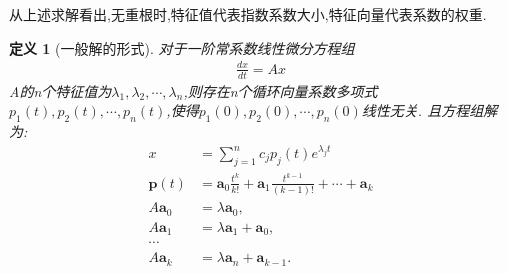 \documentclass[12pt, a4paper, oneside]{ctexbook}
\newtheorem{definition}[theorem]{定义}
\begin{document}
    从上述求解看出,无重根时,特征值代表指数系数大小,特征向量代表系数的权重.\\
    \begin{definition}[一般解的形式]
        对于一阶常系数线性微分方程组
        \begin{align}
            \frac{d\mathbf{\mathit{x}}}{dt}=A\mathbf{\mathit{x}}
        \end{align}
        A的n个特征值为$\lambda_1,\lambda_2,\cdots,\lambda_{n}$,则存在n个循环向量系数多项式
        $ p_1(t),p_2(t),\cdots,p_n(t)$,使得$ p_1(0),p_2(0),\cdots,p_n(0)$线性无关.
        且方程组解为:
        \begin{align}
            x&=\sum_{j=1}^nc_jp_j(t)e^{\lambda_jt}\\
            \boldsymbol{p}\left(t\right)&=\boldsymbol{a}_{0}\frac{t^{k}}{k!}+\boldsymbol{a}_{1}\frac{t^{k-1}}{\left(k-1\right)!}+\cdots+\boldsymbol{a}_{k}\\
            A\boldsymbol{a}_0&= \lambda\boldsymbol{a}_0,\nonumber  \\
            A\boldsymbol{a}_1&= \lambda\boldsymbol{a}_1+\boldsymbol{a}_0,\nonumber  \\
            \cdots \\
            A\boldsymbol{a}_k&=\lambda\boldsymbol{a}_n+\boldsymbol{a}_{k-1}.\nonumber
        \end{align}
    \end{definition}
\end{document}
